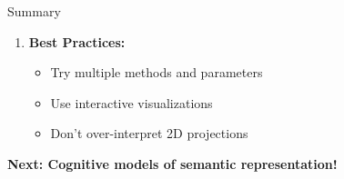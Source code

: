 \documentclass[aspectratio=169]{beamer}
\begin{document}
\begin{frame}[shrink=10]{Summary 🎯}
\begin{enumerate}
    \item \textbf{Best Practices:}
    \begin{itemize}\setlength{\itemsep}{0pt}
        \item Try multiple methods and parameters
        \item Use interactive visualizations
        \item Don't over-interpret 2D projections
    \end{itemize}
\end{enumerate}

\vspace{0.5em}
\begin{center}
\textbf{Next: Cognitive models of semantic representation!}
\end{center}
\end{frame}
\end{document}
